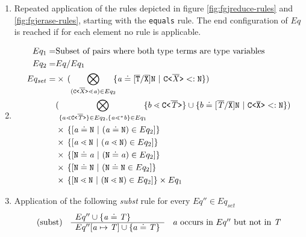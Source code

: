\begin{enumerate}
\item Repeated application of the rules depicted in figure \ref{fig:fgjreduce-rules} and \ref{fig:fgjerase-rules},
starting with the \texttt{equals} rule.
The end configuration of $Eq$ is reached if for each element no rule is applicable.
\item
\begin{align*}
Eq_1 =& \text{Subset of pairs where both type terms are type variables}\\
Eq_2 =& Eq / Eq_1 \\
Eq_{set}
    = 
    & \times\, 
    (\displaystyle{\bigotimes_{(\exptype{C}{\overline{\itype{X}}} \lessdot   \tv{a}) \in Eq_2}}\!\!
    \set{\tv{a} \doteq [\ol{T}/\ol{X}]\type{N} \ | \ \exptype{C}{\overline{\itype{X}}} <: \type{N} })\\
    & (\displaystyle{\bigotimes_{\set{a \lessdot \exptype{C}{\overline{\itype{T}}}} \in Eq_2, \set{ \tv{a} \lessdot^* \tv{b}} \in Eq_1}}\!\!
    \set{ b \lessdot \exptype{C}{\ol{\itype{T}}}} \cup \set{b \doteq [\ol{\itype{T}}/\ol{X}]\type{N} \ | \ \exptype{C}{\overline{X}} <: \type{N} })\\
    & \times\, \set{[\tv{a} \doteq \type{N} \ | \  (\tv{a} \doteq \type{N}) \in Eq_2]} \\
    & \times\, \set{[\tv{a} \lessdot \type{N} \ | \  (\tv{a} \lessdot \type{N}) \in Eq_2]}  \\
    & \times\, \set{[\type{N} \doteq \tv{a} \ | \  (\type{N} \doteq \tv{a}) \in Eq_2]}  \\
    & \times\, \set{[\type{N} \doteq \type{N} \ | \  (\type{N} \doteq \type{N} \in Eq_2]} \\
    & \times\, \set{[\type{N} \lessdot \type{N} \ | \  (\type{N} \lessdot \type{N}) \in Eq_2]} \times Eq_1 \\
\end{align*}
\item \label{subst-step}  Application of the following \emph{subst} rule for every $Eq'' \in Eq_{set}$
      $$\begin{array}[c]{lll}
        (\mathrm{subst}) &
        \begin{array}[c]{l}
          Eq'' \cup \{ \mathit{ a } \doteq \mathit{T} \}\\
          \hline
          Eq''[\mathit{ a } \mapsto \mathit{T}] \cup \{ a \doteq \mathit{T} \}
        \end{array}
        & \mathit{ a } \textrm{ occurs in } Eq'' \textrm{ but not in } \mathit{T}
      \end{array}$$
      

\end{enumerate}

